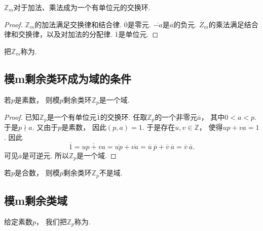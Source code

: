 \begin{proposition}\label{theorem:剩余类环.整数集对模m同余关系的商集对加法和乘法成环}
\(\mathbb{Z}_m\)对于加法、乘法成为一个有单位元的交换环.
\begin{proof}
\(\mathbb{Z}_m\)的加法满足交换律和结合律.
\(\overline{0}\)是零元.
\(\overline{-a}\)是\(\overline{a}\)的负元.
\(\overline{Z}_m\)的乘法满足结合律和交换律，以及对加法的分配律.
\(\overline{1}\)是单位元.
\end{proof}
\end{proposition}

\begin{definition}
把\(\mathbb{Z}_m\)称为.
\end{definition}

\subsection{模m剩余类环成为域的条件}
\begin{theorem}
若\(p\)是素数，
则模\(p\)剩余类环\(\mathbb{Z}_p\)是一个域.
\begin{proof}
已知\(\mathbb{Z}_p\)是一个有单位元\(\overline1\)的交换环.
任取\(\mathbb{Z}_p\)的一个非零元\(\overline{a}\)，
其中\(0<a<p\).
于是\(p \nmid a\).
又由于\(p\)是素数，
因此\((p,a)=1\).
于是存在\(u,v\in\mathbb{Z}\)，
使得\(up+va=1\).
因此\[
	\overline1
	=\overline{up+va}
	=\overline{up}
	+\overline{va}
	=\overline{u}~\overline{p}
	+\overline{v}~\overline{a}
	=\overline{v}~\overline{a}.
\]
可见\(\overline{a}\)是可逆元.
所以\(\mathbb{Z}_p\)是一个域.
\end{proof}
\end{theorem}

\begin{theorem}
若\(p\)是合数，
则模\(p\)剩余类环\(\mathbb{Z}_p\)不是域.
\end{theorem}

\subsection{模m剩余类域}
\begin{definition}
给定素数\(p\)，
我们把\(\mathbb{Z}_p\)称为.
\end{definition}

